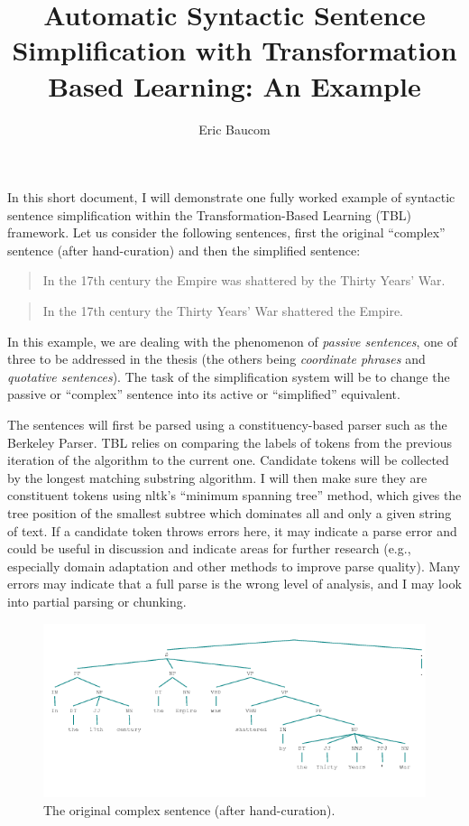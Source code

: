 \documentclass{article}
\begin{document}
\author{Eric Baucom}
\title{Automatic Syntactic Sentence Simplification with Transformation Based Learning: An Example}
\maketitle

In this short document, I will demonstrate one fully worked example of syntactic sentence simplification within the Transformation-Based Learning (TBL) framework. Let us consider the following sentences, first the original ``complex'' sentence (after hand-curation) and then the simplified sentence:

\begin{quote}
In the 17th century the Empire was shattered by the Thirty Years' War.
\end{quote}

\begin{quote}
In the 17th century the Thirty Years' War shattered the Empire.
\end{quote}

In this example, we are dealing with the phenomenon of \textit{passive sentences}, one of three to be addressed in the thesis (the others being \textit{coordinate phrases} and \textit{quotative sentences}). The task of the simplification system will be to change the passive or ``complex'' sentence into its active or ``simplified'' equivalent.

The sentences will first be parsed using a constituency-based parser such as the Berkeley Parser. TBL relies on comparing the labels of tokens from the previous iteration of the algorithm to the current one. Candidate tokens will be collected by the longest matching substring algorithm. I will then make sure they are
constituent tokens using nltk's ``minimum spanning tree'' method, which gives the
tree position of the smallest subtree which dominates all and only a given
string of text. If a candidate token throws errors here, it may
indicate a parse error and could be useful in discussion and indicate
areas for further research (e.g., especially domain adaptation and other methods to improve parse quality). Many errors may indicate that a full
parse is the wrong level of analysis, and I may look into partial parsing or chunking.

\begin{figure}
\begin{center}
\includegraphics[scale=.65]{tree}
\caption{The original complex sentence (after hand-curation).}
\end{center}
\end{figure}
\end{document}
